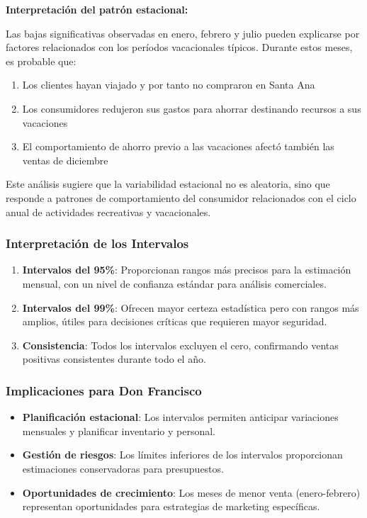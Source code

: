 \documentclass[11pt,a4paper]{article}
\begin{document}
\textbf{Interpretación del patrón estacional:}

Las bajas significativas observadas en enero, febrero y julio pueden explicarse por factores relacionados con los períodos vacacionales típicos. Durante estos meses, es probable que:

\begin{enumerate}
    \item Los clientes hayan viajado y por tanto no compraron en Santa Ana
    \item Los consumidores redujeron sus gastos para ahorrar destinando recursos a sus vacaciones
    \item El comportamiento de ahorro previo a las vacaciones afectó también las ventas de diciembre
\end{enumerate}

Este análisis sugiere que la variabilidad estacional no es aleatoria, sino que responde a patrones de comportamiento del consumidor relacionados con el ciclo anual de actividades recreativas y vacacionales.

\subsubsection{Interpretación de los Intervalos}

\begin{enumerate}
    \item \textbf{Intervalos del 95\%}: Proporcionan rangos más precisos para la estimación mensual, con un nivel de confianza estándar para análisis comerciales.
    
    \item \textbf{Intervalos del 99\%}: Ofrecen mayor certeza estadística pero con rangos más amplios, útiles para decisiones críticas que requieren mayor seguridad.
    
    \item \textbf{Consistencia}: Todos los intervalos excluyen el cero, confirmando ventas positivas consistentes durante todo el año.
\end{enumerate}

\subsubsection{Implicaciones para Don Francisco}

\begin{itemize}
    \item \textbf{Planificación estacional}: Los intervalos permiten anticipar variaciones mensuales y planificar inventario y personal.
    \item \textbf{Gestión de riesgos}: Los límites inferiores de los intervalos proporcionan estimaciones conservadoras para presupuestos.
    \item \textbf{Oportunidades de crecimiento}: Los meses de menor venta (enero-febrero) representan oportunidades para estrategias de marketing específicas.
\end{itemize}
\end{document}
